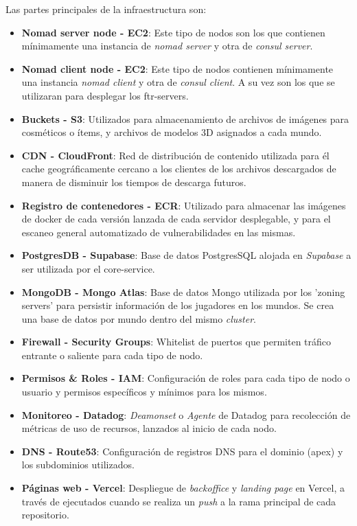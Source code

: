 Las partes principales de la infraestructura son:
\begin{itemize}
    \item \textbf{Nomad server node - EC2}: Este tipo de nodos son los que contienen mínimamente
        una instancia de \textit{nomad server} y otra de \textit{consul server}. %
    \item \textbf{Nomad client node - EC2}: Este tipo de nodos contienen mínimamente una instancia
        \textit{nomad client} y otra de \textit{consul client}. A su vez son los que se utilizaran para desplegar los ftr-servers.
    \item \textbf{Buckets - S3}: Utilizados para almacenamiento de archivos de imágenes para cosméticos o ítems,
        y archivos de modelos 3D asignados a cada mundo.
    \item \textbf{CDN - CloudFront}: Red de distribución de contenido utilizada para él cache geográficamente cercano a los clientes
        de los archivos descargados de manera de disminuir los tiempos de descarga futuros.
    \item \textbf{Registro de contenedores  - ECR}: Utilizado para almacenar las imágenes de docker de cada versión lanzada
        de cada servidor desplegable, y para el escaneo general automatizado de vulnerabilidades en las mismas.
    \item \textbf{PostgresDB - Supabase}: Base de datos PostgresSQL alojada en \textit{Supabase} a ser utilizada por el core-service.
    \item \textbf{MongoDB - Mongo Atlas}: Base de datos Mongo utilizada por los 'zoning servers' para persistir información de los jugadores
        en los mundos. Se crea una base de datos por mundo dentro del mismo \textit{cluster}.
    \item \textbf{Firewall - Security Groups}: Whitelist de puertos que permiten tráfico entrante o saliente para cada tipo de nodo.
    \item \textbf{Permisos \& Roles - IAM}: Configuración de roles para cada tipo de nodo o usuario y permisos específicos
        y mínimos para los mismos.
    \item \textbf{Monitoreo - Datadog}: \textit{Deamonset} o \textit{Agente} de Datadog para recolección de métricas de uso de recursos,
        lanzados al inicio de cada nodo.
    \item \textbf{DNS - Route53}: Configuración de registros DNS para el dominio (apex) y los subdominios utilizados.
    \item \textbf{Páginas web - Vercel}: Despliegue de \textit{backoffice} y \textit{landing page} en Vercel, a través de 
        ejecutados cuando se realiza un \textit{push} a la rama principal de cada repositorio.
\end{itemize}

